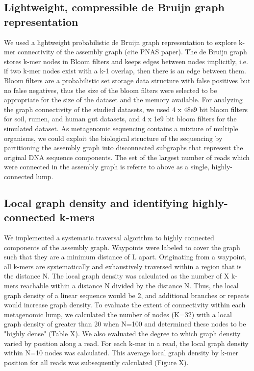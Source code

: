 \documentclass[11pt]{article} %
\begin{document}
\subsection{Lightweight, compressible de Bruijn graph representation}

We used a lightweight probabilistic de Bruijn graph representation
to explore k-mer connectivity of the assembly graph (cite PNAS paper).
The de Bruijn graph stores k-mer nodes in Bloom filters and keeps
edges between nodes implicitly, i.e. if two k-mer nodes exist with
a k-1 overlap, then there is an edge between them. Bloom filters are
a probabilistic set storage data structure with false positives but
no false negatives, thus the size of the bloom filters were selected
to be appropriate for the size of the dataset and the memory available.
For analyzing the graph connectivity of the studied datasets, we used
4 x 48e9 bit bloom filters for soil, rumen, and human gut datasets,
and 4 x 1e9 bit bloom filters for the simulated dataset. As metagenomic sequencing contains a mixture of multiple organisms, we
could exploit the biological structure of the sequencing by partitioning
the assembly graph into disconnected subgraphs that represent the
original DNA sequence components. The set of the largest number of
reads which were connected in the assembly graph is referre to above as a single, highly-connected lump. 

\subsection{Local graph density and identifying highly-connected k-mers}

We implemented a systematic traversal algorithm to highly
connected components of the assembly graph.  Waypoints were labeled to cover the graph such that they
are a minimum distance of L apart. Originating from a waypoint, all
k-mers are systematically and exhaustively traversed within a region
that is the distance N.   The local graph density was calculated as the number of X k-mers reachable within a distance N divided by the distance N.  Thus, the local graph density of a linear sequence would be 2, and additional branches or repeats would increase graph density.   To evaluate the extent of connectivity within each metagenomic lump, we calculated the number of nodes (K=32) with a local graph density of greater than 20 when N=100 and determined these nodes to be "highly dense" (Table X).  We also evaluated the degree to which graph density varied by position along a read.  For each k-mer in a read, the local graph density within N=10 nodes was calculated.  This average local graph density by k-mer position for all reads was subsequently calculated (Figure X).
\end{document}
